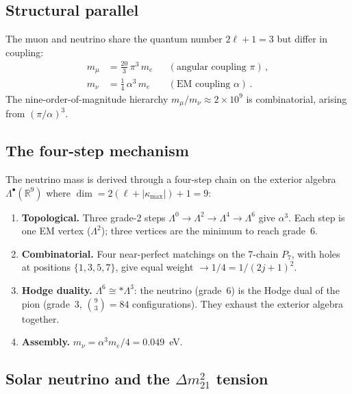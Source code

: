 \documentclass[aps,prd,twocolumn,superscriptaddress,nofootinbib,longbibliography]{revtex4-2}
\newcommand{\kmax}{|\kappa_{\mathrm{max}}|}
\begin{document}
\subsection{Structural parallel}

The muon and neutrino share the quantum number $2\ell + 1 = 3$ but
differ in coupling:
\begin{align}
  m_\mu &= \frac{20}{3}\,\pi^3\,m_e
    &&(\text{angular coupling }\pi)\,,\\
  m_\nu &= \frac{1}{4}\,\alpha^3\,m_e
    &&(\text{EM coupling }\alpha)\,.
\end{align}
The nine-order-of-magnitude hierarchy $m_\mu/m_\nu \approx 2 \times
10^9$ is combinatorial, arising from $(\pi/\alpha)^3$.

\subsection{The four-step mechanism}

The neutrino mass is derived through a four-step chain on the exterior
algebra $\Lambda^\bullet(\mathbb{R}^9)$ where
$\dim = 2(\ell + \kmax) + 1 = 9$:
\begin{enumerate}
\item \textbf{Topological.}  Three grade-2 steps
  $\Lambda^0 \to \Lambda^2 \to \Lambda^4 \to \Lambda^6$ give
  $\alpha^3$.  Each step is one EM vertex ($\Lambda^2$); three
  vertices are the minimum to reach grade~6.
\item \textbf{Combinatorial.}  Four near-perfect matchings on the
  7-chain $P_7$, with holes at positions $\{1,3,5,7\}$, give equal
  weight $\to 1/4 = 1/(2j+1)^2$.
\item \textbf{Hodge duality.}  $\Lambda^6 \cong {*}\Lambda^3$:
  the neutrino (grade~6) is the Hodge dual of the pion (grade~3,
  $\binom{9}{3} = 84$ configurations).  They exhaust the exterior
  algebra together.
\item \textbf{Assembly.}  $m_\nu = \alpha^3 m_e/4 = 0.049$~eV.
\end{enumerate}

\subsection{Solar neutrino and the $\Delta m^2_{21}$ tension}
\end{document}
